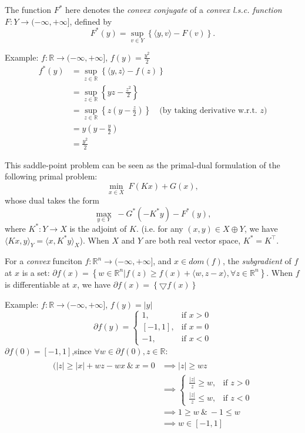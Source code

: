 \documentclass[twoside,12pt,openright]{report}  %
\begin{document}
The function \( F^* \) here denotes the \emph{convex conjugate} of a \emph{convex l.s.c. function} \( F : Y \to (-\infty, +\infty] \), defined by
\[
F^*(y) = \sup_{v \in Y} \left\{ \langle y, v \rangle - F(v) \right\}.
\]

Example: \(f : \mathbb{R} \to (-\infty, +\infty] \), \(f(y) = \frac{y^2}{2}\)
\[
\begin{aligned}
f^*(y) &= \sup_{z \in \mathbb{R}} \left\{ \langle y, z \rangle - f(z) \right\} \\
       &= \sup_{z \in \mathbb{R}} \left\{ yz - \frac{z^2}{2} \right\} \\
       &= \sup_{z \in \mathbb{R}} \left\{z(y - \frac{z}{2}) \right\} \quad \text{(by taking derivative w.r.t. } z \text{)} \\
       &= y(y - \frac{y}{2}) \\
       &= \frac{y^2}{2}
\end{aligned}
\]

This saddle-point problem can be seen as the primal-dual formulation of the following primal problem:
\begin{equation}
    \min_{x \in X} \; F(Kx) + G(x),
\end{equation}
whose dual takes the form
\begin{equation}
    \max_{y \in Y} \; -G^*(-K^* y) - F^*(y),
\end{equation}
where \( K^* : Y \to X \) is the adjoint of \( K \). (i.e. for any \((x,y) \in X \oplus Y \), we have \(\langle Kx, y \rangle_Y = \langle x, K^* y \rangle_X\)). When \(X\) and \(Y\) are both real vector space, \(K^* = K^\top \).

For a \emph{convex} funciton \(f : \mathbb{R}^n \to (-\infty, +\infty]\), and \(x \in dom(f)\), the \emph{subgradient} of \(f\) at \(x\) is a set: \(\partial f(x) = \left\{ w \in \mathbb{R}^n|f(z) \ge f(x) + \langle w, z-x \rangle, \forall z \in \mathbb{R}^n \right\}\).
When \(f\) is differentiable at \(x\), we have \(\partial f(x) = \left\{ \bigtriangledown f(x) \right\}\)

Example: \(f : \mathbb{R} \to (-\infty, +\infty] \), \(f(y) = |y|\)
\[
\partial f(y) = \begin{cases}
1, & \text{if } x > 0\\
[-1,1], & \text{if } x = 0\\
-1, & \text{if } x<0
\end{cases}
\]
\(\partial f(0) = [-1,1]\),since \(\forall w \in \partial f(0), z \in \mathbb{R}\):
\[
\begin{aligned}
\\(|z| \ge|x|+wz-wx \ \& \  x=0 &\implies |z| \ge wz \\
                  &\implies \begin{cases}
\frac{|z|}{z} \ge w, & \text{if } z > 0\\
\frac{|z|}{z} \le w, & \text{if } z < 0
\end{cases}\\
&\implies 1 \ge w \ \& \ -1 \le w \\
&\implies w \in [-1,1]
\end{aligned}
\]
\end{document}
